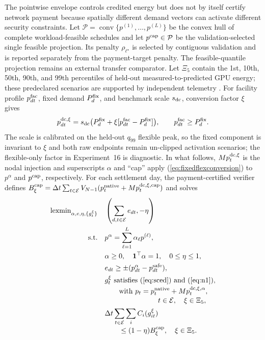 \documentclass[10pt,journal]{IEEEtran}
\newcommand{\PaymentSafe}{payment-certified verifier}
\newcommand{\dt}{\Delta t}
\begin{document}
The pointwise envelope controls credited energy but does not by itself certify
network payment because spatially different demand vectors can activate
different security constraints. Let $\mathcal P=\operatorname{conv}
\{p^{(1)},\ldots,p^{(L)}\}$ be the convex hull of complete workload-feasible
schedules and let $p^{\rm cap}\in\mathcal P$ be the validation-selected
single feasible projection. Its penalty $\rho_{\ell^\star}$ is selected by
contiguous validation and is reported separately from the payment-target
penalty. The feasible-quantile projection remains an external transfer
comparator. Let $\Xi_5$ contain the 1st, 10th, 50th, 90th, and 99th percentiles
of held-out measured-to-predicted GPU energy; these predeclared scenarios are
supported by independent telemetry \cite{samsi2021supercloud}. For facility
profile $p^{\rm fac}_{dt}$, fixed demand $P^{\rm fix}_d$, and benchmark scale
$s_{\rm dc}$, conversion factor $\xi$ gives
\begin{equation}
 p^{\rm dc,\xi}_{dt}=s_{\rm dc}\bigl(P^{\rm fix}_d+\xi[p^{\rm fac}_{dt}-P^{\rm fix}_d]\bigr),
 \qquad p^{\rm fac}_{dt}\geq P^{\rm fix}_d .
 \label{eq:fixedflexconversion}
\end{equation}
The scale is calibrated on the held-out $q_{99}$ flexible peak, so the fixed
component is invariant to $\xi$ and both raw endpoints remain un-clipped
activation scenarios; the flexible-only factor in Experiment~16 is diagnostic.
In what follows, $M p^{\rm dc,\xi}_t$ is the nodal injection and superscripts
$\alpha$ and ``cap'' apply
(\ref{eq:fixedflexconversion}) to $p^\alpha$ and $p^{\rm cap}$, respectively.
For each settlement day, the
\PaymentSafe{} defines
$B_\xi^{\rm cap}=\dt\sum_{t\in\mathcal E}
V_{N-1}(p_t^{\rm native}+M p_t^{\rm dc,\xi,cap})$ and solves
\begin{align}
\operatorname{lexmin}_{\alpha,e,\eta,\{g_t^\xi\}}\quad&
 \left(\sum_{d,t\in\mathcal E}e_{dt},-\eta\right)
 \label{eq:paymentcert}\\
\mathrm{s.t.}\quad&
 p^\alpha=\sum_{\ell=1}^{L}\alpha_\ell p^{(\ell)},\nonumber\\
&\alpha\geq0,\quad\mathbf1^\top\alpha=1,\quad 0\leq\eta\leq1,\nonumber\\
&e_{dt}\geq\pm(p^\alpha_{dt}-p^{\rm safe}_{dt}),\nonumber\\
&g_t^\xi\ \text{satisfies (\ref{eq:sced}) and (\ref{eq:n1})},\nonumber\\[-2pt]
&\hspace{2em}\text{with }p_t=p_t^{\rm native}+M p_t^{\rm dc,\xi,\alpha},\nonumber\\[-2pt]
&\hspace{7.5em}t\in\mathcal E,\quad \xi\in\Xi_5,\nonumber\\
&\dt\sum_{t\in\mathcal E}\sum_iC_i(g_{it}^\xi)\nonumber\\[-2pt]
&\hspace{2em}\leq(1-\eta)B_\xi^{\rm cap},
\quad \xi\in\Xi_5.\nonumber
\end{align}
\end{document}
